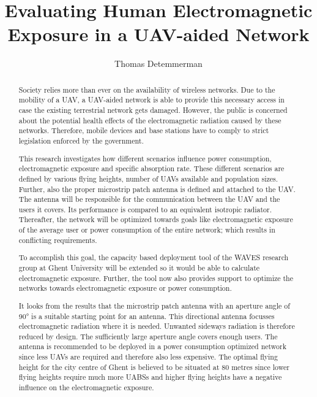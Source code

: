 \documentclass[twocolumn]{phdsymp} %
\begin{document}
\title{Evaluating Human Electromagnetic Exposure in a UAV-aided Network}

\author{Thomas Detemmerman}


\maketitle

\begin{abstract}
  Society relies more than ever on the availability of wireless networks.
  Due to the mobility of a UAV, a UAV-aided network is able to provide this necessary access in case the existing terrestrial network gets damaged.
  However,  the public is 
  concerned about the potential health effects of the electromagnetic radiation caused by these networks.
  Therefore, mobile devices and base stations have to comply to strict legislation enforced by the government.
  
  This research investigates how different scenarios influence power consumption, electromagnetic exposure and specific absorption rate.
  These different scenarios are defined by various flying heights, number of UAVs available and population sizes. Further, also 
  the proper microstrip patch antenna is defined and attached to the UAV. 
  The antenna will be responsible for the communication between the UAV and the users it covers.
  Its performance is compared to  
  an equivalent isotropic radiator.
  Thereafter, the network will be optimized towards goals like electromagnetic exposure of the average user or 
  power consumption of the entire network; which results in conflicting requirements.
  
  To accomplish this goal, the capacity based deployment tool of the WAVES research group at Ghent University
  will be extended so it would be able to calculate electromagnetic exposure.
  Further, the tool now also provides support to optimize the networks towards electromagnetic exposure or power consumption.
  
  It looks from the results that 
  the microstrip patch antenna with an aperture angle of \ang{90} is a suitable starting point for an antenna. 
  This directional antenna focusses electromagnetic radiation where it is needed. Unwanted sideways radiation 
  is therefore reduced by design.
  The sufficiently large aperture angle covers enough users. The antenna is recommended to be deployed in a power consumption 
  optimized network since less \gls{UAV}s are required and therefore also less expensive.
  The optimal flying height for the city centre of Ghent is believed to be situated at 80 metres since lower flying heights require much more UABSs and
  higher flying heights have a negative influence on the electromagnetic exposure.  
\end{abstract}
\end{document}
